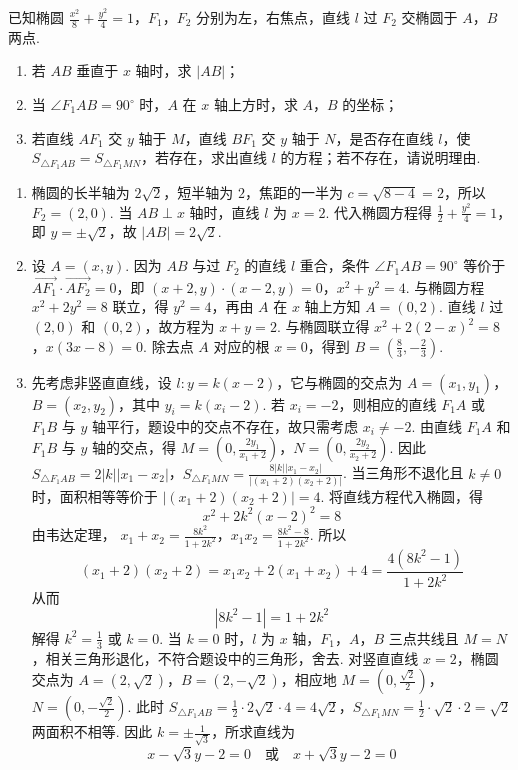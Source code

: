 \begin{problem}
已知椭圆 \(\frac{x^2}{8}+\frac{y^2}{4}=1\)，\(F_1\)，\(F_2\) 分别为左，右焦点，直线 \(l\) 过 \(F_2\) 交椭圆于 \(A\)，\(B\) 两点.

\begin{enumerate}
\item 若 \(AB\) 垂直于 \(x\) 轴时，求 \(|AB|\)；
\item 当 \(\angle F_1AB=90^\circ\) 时，\(A\) 在 \(x\) 轴上方时，求 \(A\)，\(B\) 的坐标；
\item 若直线 \(AF_1\) 交 \(y\) 轴于 \(M\)，直线 \(BF_1\) 交 \(y\) 轴于 \(N\)，是否存在直线 \(l\)，使 \(S_{\triangle F_1AB}=S_{\triangle F_1MN}\)，若存在，求出直线 \(l\) 的方程；若不存在，请说明理由.
\end{enumerate}
\end{problem}

\begin{solution}
\begin{enumerate}
\item 椭圆的长半轴为 \(2\sqrt2\)，短半轴为 \(2\)，焦距的一半为 \(c=\sqrt{8-4}=2\)，所以 \(F_2=(2,0)\). 当 \(AB\perp x\) 轴时，直线 \(l\) 为 \(x=2\). 代入椭圆方程得 \(\frac12+\frac{y^2}{4}=1\)，即 \(y=\pm\sqrt2\)，故 \(|AB|=2\sqrt2\).
\item 设 \(A=(x,y)\). 因为 \(AB\) 与过 \(F_2\) 的直线 \(l\) 重合，条件 \(\angle F_1AB=90^\circ\) 等价于 \(\overrightarrow{AF_1}\cdot\overrightarrow{AF_2}=0\)，即
\((x+2,y)\cdot(x-2,y)=0\)，\(x^2+y^2=4\).
与椭圆方程 \(x^2+2y^2=8\) 联立，得 \(y^2=4\)，再由 \(A\) 在 \(x\) 轴上方知 \(A=(0,2)\). 直线 \(l\) 过 \((2,0)\) 和 \((0,2)\)，故方程为 \(x+y=2\). 与椭圆联立得
\(x^2+2(2-x)^2=8\)，\(x(3x-8)=0\).
除去点 \(A\) 对应的根 \(x=0\)，得到 \(B=\left(\frac83,-\frac23\right)\).
\item 先考虑非竖直直线，设 \(l:y=k(x-2)\)，它与椭圆的交点为 \(A=(x_1,y_1)\)，\(B=(x_2,y_2)\)，其中 \(y_i=k(x_i-2)\). 若 \(x_i=-2\)，则相应的直线 \(F_1A\) 或 \(F_1B\) 与 \(y\) 轴平行，题设中的交点不存在，故只需考虑 \(x_i\ne-2\). 由直线 \(F_1A\) 和 \(F_1B\) 与 \(y\) 轴的交点，得
\(M=\left(0,\frac{2y_1}{x_1+2}\right)\)，\(N=\left(0,\frac{2y_2}{x_2+2}\right)\).
因此
\(S_{\triangle F_1AB}=2|k||x_1-x_2|\)，\(S_{\triangle F_1MN}=\frac{8|k||x_1-x_2|}{|(x_1+2)(x_2+2)|}\).
当三角形不退化且 \(k\ne0\) 时，面积相等等价于 \(|(x_1+2)(x_2+2)|=4\). 将直线方程代入椭圆，得
\[
x^2+2k^2(x-2)^2=8
\]
由韦达定理，
\(x_1+x_2=\frac{8k^2}{1+2k^2}\)，\(x_1x_2=\frac{8k^2-8}{1+2k^2}\).
所以
\[
(x_1+2)(x_2+2)=x_1x_2+2(x_1+x_2)+4=\frac{4(8k^2-1)}{1+2k^2}
\]
从而
\[
|8k^2-1|=1+2k^2
\]
解得 \(k^2=\frac13\) 或 \(k=0\). 当 \(k=0\) 时，\(l\) 为 \(x\) 轴，\(F_1\)，\(A\)，\(B\) 三点共线且 \(M=N\)，相关三角形退化，不符合题设中的三角形，舍去. 对竖直直线 \(x=2\)，椭圆交点为 \(A=(2,\sqrt2)\)，\(B=(2,-\sqrt2)\)，相应地 \(M=(0,\frac{\sqrt2}{2})\)，\(N=(0,-\frac{\sqrt2}{2})\). 此时
\(S_{\triangle F_1AB}=\frac12\cdot2\sqrt2\cdot4=4\sqrt2\)，\(S_{\triangle F_1MN}=\frac12\cdot\sqrt2\cdot2=\sqrt2\)
两面积不相等. 因此 \(k=\pm\frac1{\sqrt3}\)，所求直线为
\[
x-\sqrt3y-2=0\quad\text{或}\quad x+\sqrt3y-2=0
\]
\end{enumerate}
\end{solution}

